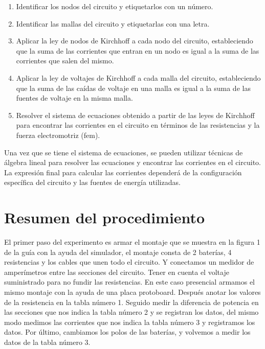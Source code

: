 \documentclass[twocolumn, 12pt]{article}
\begin{document}
\begin{enumerate}
	\item Identificar los nodos del circuito y etiquetarlos con un
	      número.
	\item Identificar las mallas del circuito y etiquetarlas con una
	      letra.
	\item Aplicar la ley de nodos de Kirchhoff a cada nodo del
	      circuito, estableciendo que la suma de las corrientes que
	      entran en un nodo es igual a la suma de las corrientes que
	      salen del mismo.
	\item Aplicar la ley de voltajes de Kirchhoff a cada malla del
	      circuito, estableciendo que la suma de las caídas de
	      voltaje en una malla es igual a la suma de las fuentes de
	      voltaje en la misma malla.
	\item Resolver el sistema de ecuaciones obtenido a partir de las
	      leyes de Kirchhoff para encontrar las corrientes en el
	      circuito en términos de las resistencias y la fuerza
	      electromotriz (fem).
\end{enumerate}

Una vez que se tiene el sistema de ecuaciones, se pueden
utilizar técnicas de álgebra lineal para resolver las
ecuaciones y encontrar las corrientes en el circuito. La
expresión final para calcular las corrientes dependerá de
la configuración específica del circuito y las fuentes de
energía utilizadas.

\section{Resumen del procedimiento}

El primer paso del experimento es armar el montaje que se
muestra en la figura 1 de la guía con la ayuda del
simulador, el montaje consta de 2 baterías, 4 resistencias
y los cables que unen todo el circuito. Y conectamos un
medidor de amperímetros entre las secciones del circuito.
Tener en cuenta el voltaje suministrado para no fundir las
resistencias. En este caso presencial armamos el mismo
montaje con la ayuda de una placa protoboard. Después
anotar los valores de la resistencia en la tabla número 1.
Seguido medir la diferencia de potencia en las secciones
que nos indica la tabla número 2 y se registran los datos,
del mismo modo medimos las corrientes que nos indica la
tabla número 3 y registramos los datos. Por último,
cambiamos los polos de las baterías, y volvemos a medir los
datos de la tabla número 3.

\newpage

\printbibliography
\end{document}
